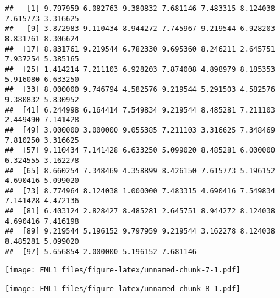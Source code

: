 \documentclass[
]{article}
\newenvironment{Shaded}{\begin{snugshade}}{\end{snugshade}}
\newcommand{\AttributeTok}[1]{\textcolor[rgb]{0.13,0.29,0.53}{#1}}
\newcommand{\DecValTok}[1]{\textcolor[rgb]{0.00,0.00,0.81}{#1}}
\newcommand{\FunctionTok}[1]{\textcolor[rgb]{0.13,0.29,0.53}{\textbf{#1}}}
\newcommand{\NormalTok}[1]{#1}
\newcommand{\SpecialCharTok}[1]{\textcolor[rgb]{0.81,0.36,0.00}{\textbf{#1}}}
\newcommand{\StringTok}[1]{\textcolor[rgb]{0.31,0.60,0.02}{#1}}
\begin{document}
\begin{verbatim}
##   [1] 9.797959 6.082763 9.380832 7.681146 7.483315 8.124038 7.615773 3.316625
##   [9] 3.872983 9.110434 8.944272 7.745967 9.219544 6.928203 8.831761 8.306624
##  [17] 8.831761 9.219544 6.782330 9.695360 8.246211 2.645751 7.937254 5.385165
##  [25] 1.414214 7.211103 6.928203 7.874008 4.898979 8.185353 5.916080 6.633250
##  [33] 8.000000 9.746794 4.582576 9.219544 5.291503 4.582576 9.380832 5.830952
##  [41] 6.244998 6.164414 7.549834 9.219544 8.485281 7.211103 2.449490 7.141428
##  [49] 3.000000 3.000000 9.055385 7.211103 3.316625 7.348469 7.810250 3.316625
##  [57] 9.110434 7.141428 6.633250 5.099020 8.485281 6.000000 6.324555 3.162278
##  [65] 8.660254 7.348469 4.358899 8.426150 7.615773 5.196152 4.690416 5.099020
##  [73] 8.774964 8.124038 1.000000 7.483315 4.690416 7.549834 7.141428 4.472136
##  [81] 6.403124 2.828427 8.485281 2.645751 8.944272 8.124038 4.690416 7.416198
##  [89] 9.219544 5.196152 9.797959 9.219544 3.162278 8.124038 8.485281 5.099020
##  [97] 5.656854 2.000000 5.196152 7.681146
\end{verbatim}

\begin{Shaded}
\end{Shaded}

\texttt{[image: FML1\_files/figure-latex/unnamed-chunk-7-1.pdf]}

\begin{Shaded}
\end{Shaded}

\texttt{[image: FML1\_files/figure-latex/unnamed-chunk-8-1.pdf]}
\end{document}
